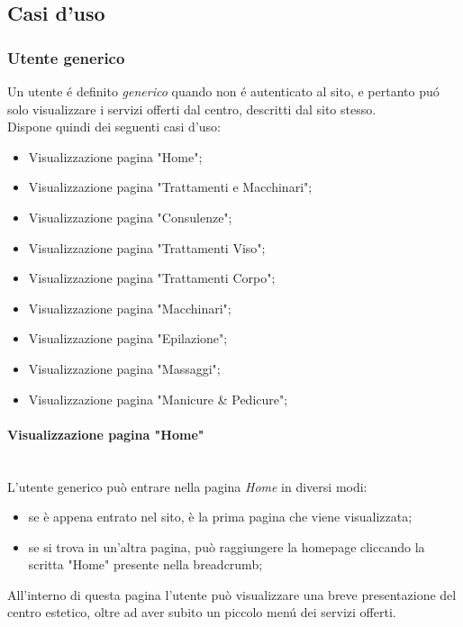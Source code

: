 \documentclass[]{article}
\begin{document}
\subsection{Casi d'uso}
\subsubsection{Utente generico}
Un utente é definito \textit{generico} quando non é autenticato al sito, e pertanto puó solo visualizzare i servizi offerti dal centro, descritti dal sito stesso.\\
Dispone quindi dei seguenti casi d'uso:
\begin{itemize}
	\item Visualizzazione pagina "Home";
	\item Visualizzazione pagina "Trattamenti e Macchinari";
	\item Visualizzazione pagina "Consulenze";
	\item Visualizzazione pagina "Trattamenti Viso";
	\item Visualizzazione pagina "Trattamenti Corpo";
	\item Visualizzazione pagina "Macchinari";
	\item Visualizzazione pagina "Epilazione";
	\item Visualizzazione pagina "Massaggi";
	\item Visualizzazione pagina "Manicure \& Pedicure";
\end{itemize}
\paragraph{Visualizzazione pagina "Home"}\mbox{}\\
L'utente generico può entrare nella pagina \textit{Home} in diversi modi:
\begin{itemize}
	\item se è appena entrato nel sito, è la prima pagina che viene visualizzata;
	\item se si trova in un'altra pagina, può raggiungere la homepage cliccando la scritta "Home" presente nella breadcrumb;
\end{itemize}
All'interno di questa pagina l'utente può visualizzare una breve presentazione del centro estetico, oltre ad aver subito un piccolo menú dei servizi offerti.\\
\end{document}
